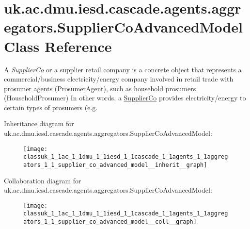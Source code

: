 \hypertarget{classuk_1_1ac_1_1dmu_1_1iesd_1_1cascade_1_1agents_1_1aggregators_1_1_supplier_co_advanced_model}{\section{uk.\-ac.\-dmu.\-iesd.\-cascade.\-agents.\-aggregators.\-Supplier\-Co\-Advanced\-Model Class Reference}
\label{classuk_1_1ac_1_1dmu_1_1iesd_1_1cascade_1_1agents_1_1aggregators_1_1_supplier_co_advanced_model}
}


A {\itshape \hyperlink{classuk_1_1ac_1_1dmu_1_1iesd_1_1cascade_1_1agents_1_1aggregators_1_1_supplier_co}{Supplier\-Co}} or a supplier retail company is a concrete object that represents a commercial/business electricity/energy company involved in retail trade with prosumer agents ({\ttfamily Prosumer\-Agent}), such as household prosumers ({\ttfamily Household\-Prosumer}) In other words, a {\ttfamily \hyperlink{classuk_1_1ac_1_1dmu_1_1iesd_1_1cascade_1_1agents_1_1aggregators_1_1_supplier_co}{Supplier\-Co}} provides electricity/energy to certain types of prosumers (e.\-g.  




Inheritance diagram for uk.\-ac.\-dmu.\-iesd.\-cascade.\-agents.\-aggregators.\-Supplier\-Co\-Advanced\-Model\-:\nopagebreak
\begin{figure}[H]
\begin{center}
\leavevmode
\texttt{[image: classuk\_1\_1ac\_1\_1dmu\_1\_1iesd\_1\_1cascade\_1\_1agents\_1\_1aggregators\_1\_1\_supplier\_co\_advanced\_model\_\_inherit\_\_graph]}
\end{center}
\end{figure}


Collaboration diagram for uk.\-ac.\-dmu.\-iesd.\-cascade.\-agents.\-aggregators.\-Supplier\-Co\-Advanced\-Model\-:\nopagebreak
\begin{figure}[H]
\begin{center}
\leavevmode
\texttt{[image: classuk\_1\_1ac\_1\_1dmu\_1\_1iesd\_1\_1cascade\_1\_1agents\_1\_1aggregators\_1\_1\_supplier\_co\_advanced\_model\_\_coll\_\_graph]}
\end{center}
\end{figure}
